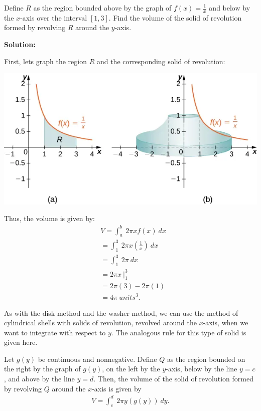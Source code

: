 \documentclass{report}
\begin{document}
  \pagebreak \bigbreak \noindent 
  \begin{eg}
     Define $R$ as the region bounded above by the graph of  $f(x) = \frac{1}{x}$ and below by the  $x$-axis over the interval  $[1,3]$. Find the volume of the solid of revolution formed by revolving  $R$ around the  $y$-axis. 
  \end{eg}
  \bigbreak \noindent 
  \textbf{Solution:} 
  \bigbreak \noindent 
  \begin{minipage}[]{0.47\textwidth}
    First, lets graph the region $R$ and the corresponding solid of revolution: 
    \bigbreak \noindent 
    \begin{center}
        \includegraphics[scale=0.4]{./figures/graph29.png}
    \end{center}
  \end{minipage}
  \begin{minipage}[]{0.47\textwidth}
    Thus, the volume is given by:
    \begin{align*}
        &V = \int_{a}^{b}\ 2\pi xf(x)\ dx \\
        &= \int_{1}^{3}\ 2\pi x\left(\frac{1}{x}\right)\ dx \\
        &= \int_{1}^{3}\ 2\pi \ dx \\ 
        &= 2\pi x\ \bigg|^{3}_1 \\
        &= 2\pi(3) - 2\pi(1) \\
        &= 4\pi\ units^{3}
    .\end{align*}
  \end{minipage}
  \bigbreak \noindent 
  As with the disk method and the washer method, we can use the method of cylindrical shells with solids of revolution, revolved around the  $x$-axis, when we want to integrate with respect to  $y$. The analogous rule for this type of solid is given here.
  \bigbreak \noindent 
  \begin{thrm}
     Let \( g(y) \) be continuous and nonnegative. Define \( Q \) as the region bounded on the right by the graph of \( g(y) \), on the left by the \( y \)-axis, below by the line \( y = c \), and above by the line \( y = d \). Then, the volume of the solid of revolution formed by revolving \( Q \) around the \( x \)-axis is given by
     \begin{align*}
         V = \int_{c}^{d}\ 2\pi y(g(y))\ dy
     .\end{align*}
 
  \end{thrm}
\end{document}
